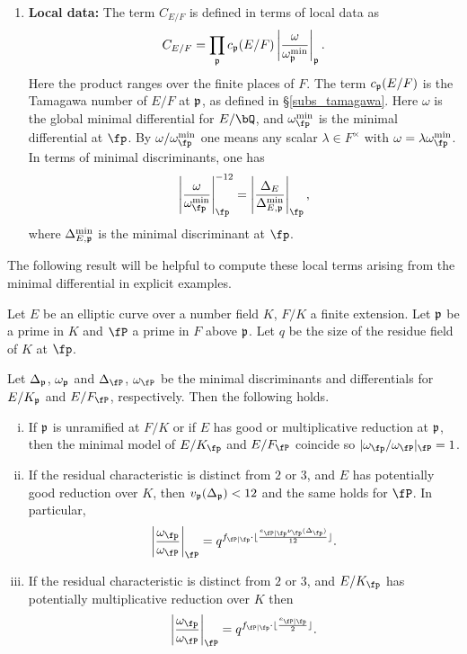 \begin{enumerate}
    \item \textbf{Local data:} The term $C_{E/F}$ is defined in terms of local data as 
    \begin{equation*}%
    C_{E/F}=\prod_{\pp}c_\pp(E/F)\left|\frac{\omega}{\omega_\pp^{\min}}\right|_\pp.
    \end{equation*}
    Here the product ranges over the finite places of $F$. The term $c_{\mathfrak{p}}(E/F)$ is the Tamagawa number of $E/F$ at $\mathfrak{p}$, as defined in \S\ref{subs_tamagawa}.
    Here $\omega$ is the global minimal differential for $E / \bQ$, and $\omega_{\fp}^{\min}$ is the minimal differential at $\fp$. By $\omega / \omega_{\fp}^{\min}$ one means any scalar $\lambda \in F^{\times}$ with $\omega = \lambda \omega_{\fp}^{\min}$. In terms of minimal discriminants, one has
    \[ \left| \frac{\omega}{\omega_{\fp}^{\min}} \right|_{\fp}^{-12} = \left|\frac{\Delta_E}{\Delta_{E, \pp}^{\min}} \right|_{\fp}, \]
    where $\Delta_{E, \mathfrak{p}}^{\min}$ is the minimal discriminant at $\fp$.    
\end{enumerate}

The following result will be helpful to compute these local terms arising from the minimal differential in explicit examples.
\begin{lemma}\label{lem_Dterms}
    Let $E$ be an elliptic curve over a number field $K$, $F/K$ a finite extension. Let $\mathfrak{p}$ be a prime in $K$ and $\fP$ a prime in $F$ above $\mathfrak{p}$. Let $q$ be the size of the residue field of $K$ at $\fp$. %

    Let $\Delta_{\mathfrak{p}}$, $\omega_{\mathfrak{p}}$ and $\Delta_\fP$, $\omega_{\fP}$ be the minimal discriminants and differentials for $E/K_{\mathfrak{p}}$ and $E/F_\fP$, respectively. Then the following holds.
    \begin{enumerate}[(i)]
        \setlength\itemsep{0em}
        \item If $\mathfrak{p}$ is unramified at $F/K$ or if $E$ has good or multiplicative reduction at $\mathfrak{p}$, then the minimal model of $E / K_{\fp}$ and $E / F_{\fP}$ coincide so $| \omega_{\fp} / \omega_{\fP} |_{\fP} = 1$. 
        
        \item If the residual characteristic is distinct from $2$ or $3$, and $E$ has potentially good reduction over $K$, then $v_{\mathfrak{p}}(\Delta_{\mathfrak{p}})<12$ and the same holds for $\fP$. In particular, 
        $$\left|\frac{\omega_{\fp}}{\omega_{\fP}}\right|_{\fP} = q^{f_{\fP \mid \fp}\cdot\floor{\frac{e_{\fP\mid\fp}\nu_\fp(\Delta_\fp)}{12}}}.$$
        \item If the residual characteristic is distinct from $2$ or $3$, and $E / K_{\fp}$ has potentially multiplicative reduction over $K$ then 
        $$ \left|\frac{\omega_{\fp}}{\omega_{\fP}}\right|_{\fP} = q^{f_{\fP \mid \fp} \cdot \floor{\frac{e_{\fP \mid \fp}}{2}}}.$$
    \end{enumerate}
\end{lemma}

